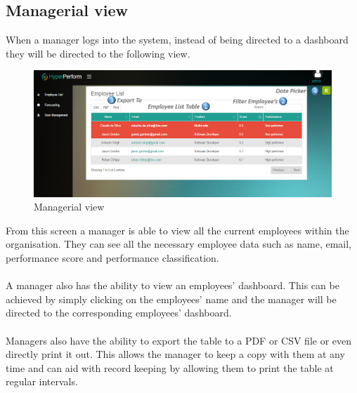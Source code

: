 \documentclass[11pt,a4paper]{article}
\begin{document}
\subsection{Managerial view}
When a manager logs into the system, instead of being directed to a dashboard they will be directed to the following view.

\begin{figure}[H]
	\begin{center}
		\includegraphics[width=\linewidth]{../Images/Getting_Started/Man_page_numbered}
		\caption{Managerial view}
	\end{center}
\end{figure}

\noindent
From this screen a manager is able to view all the current employees within the organisation. They can see all the necessary employee data such as name, email, performance score and performance classification. \\ \\ 
\noindent
A manager also has the ability to view an employees' dashboard. This can be achieved by simply clicking on the employees' name and the manager will be directed to the corresponding employees' dashboard. \\ \\
\noindent
Managers also have the ability to export the table to a PDF or CSV file or even directly print it out. This allows the manager to keep a copy with them at any time and can aid with record keeping by allowing them to print the table at regular intervals.
\end{document}
